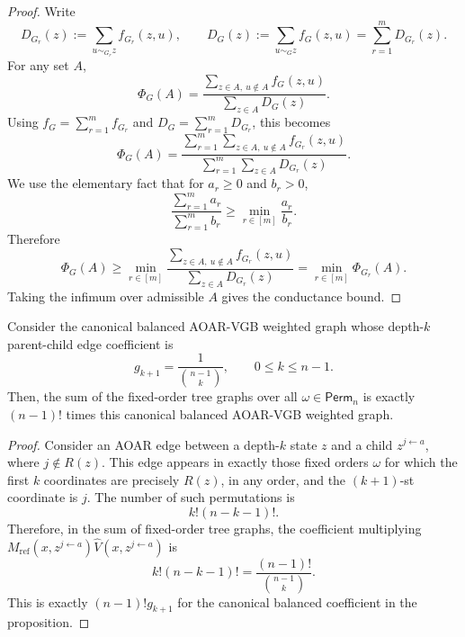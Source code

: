 \documentclass{article}
\numberwithin{theorem}{section}
\numberwithin{proposition}{section}
\numberwithin{corollary}{section}
\numberwithin{lemma}{section}
\numberwithin{conjecture}{section}
\numberwithin{remark}{section}
\numberwithin{definition}{section}
\numberwithin{assumption}{section}
\numberwithin{example}{section}
\newcommand{\lbra}[1]{\left[#1\right]}
\begin{document}
\begin{proof}
Write
\begin{equation*}
    D_{G_r}(z):=\sum_{u\sim_{G_r} z} f_{G_r}(z,u), \qquad D_G(z):=\sum_{u\sim_G z} f_G(z,u)=\sum_{r=1}^m D_{G_r}(z).
\end{equation*}
For any set $A$,
\begin{equation*}
    \Phi_G(A)=\frac{\sum_{z\in A,\ u\notin A}f_G(z,u)}{\sum_{z\in A}D_G(z)}.
\end{equation*}
Using $f_G=\sum_{r=1}^m f_{G_r}$ and $D_G=\sum_{r=1}^m D_{G_r}$, this becomes
\begin{equation*}
    \Phi_G(A)=\frac{\sum_{r=1}^m\sum_{z\in A,\ u\notin A} f_{G_r}(z,u)}{\sum_{r=1}^m\sum_{z\in A}D_{G_r}(z)}.
\end{equation*}
We use the elementary fact that for $a_r\ge 0$ and $b_r>0$,
\begin{equation*}
    \frac{\sum_{r=1}^m a_r}{\sum_{r=1}^m b_r}\ge \min_{r\in\lbra{m}}\frac{a_r}{b_r}.
\end{equation*}
Therefore
\begin{equation*}
    \Phi_G(A)\ge \min_{r\in\lbra{m}}\frac{\sum_{z\in A,\ u\notin A} f_{G_r}(z,u)}{\sum_{z\in A}D_{G_r}(z)}=\min_{r\in\lbra{m}}\Phi_{G_r}(A).
\end{equation*}
Taking the infimum over admissible $A$ gives the conductance bound.
\end{proof}

\begin{proposition}
\label{prop:canonical_as_sum_of_trees}
Consider the canonical balanced AOAR-VGB weighted graph whose depth-$k$ parent-child edge coefficient is
\begin{equation*}
    g_{k+1}=\frac{1}{\binom{n-1}{k}}, \qquad 0\le k\le n-1.
\end{equation*}
Then, the sum of the fixed-order tree graphs over all $\omega\in\mathsf{Perm}_n$ is exactly $(n-1)!$ times this canonical balanced AOAR-VGB weighted graph.
\end{proposition}

\begin{proof}
Consider an AOAR edge between a depth-$k$ state $z$ and a child $z^{j\leftarrow a}$, where $j\notin R(z)$. This edge appears in exactly those fixed orders $\omega$ for which the first $k$ coordinates are precisely $R(z)$, in any order, and the $(k+1)$-st coordinate is $j$. The number of such permutations is
\begin{equation*}
    k!(n-k-1)!.
\end{equation*}
Therefore, in the sum of fixed-order tree graphs, the coefficient multiplying $M_{\text{ref}}(x,z^{j\leftarrow a})\widehat V(x,z^{j\leftarrow a})$ is
\begin{equation*}
    k!(n-k-1)! = \frac{(n-1)!}{\binom{n-1}{k}}.
\end{equation*}
This is exactly $(n-1)!g_{k+1}$ for the canonical balanced coefficient in the proposition.
\end{proof}
\end{document}
